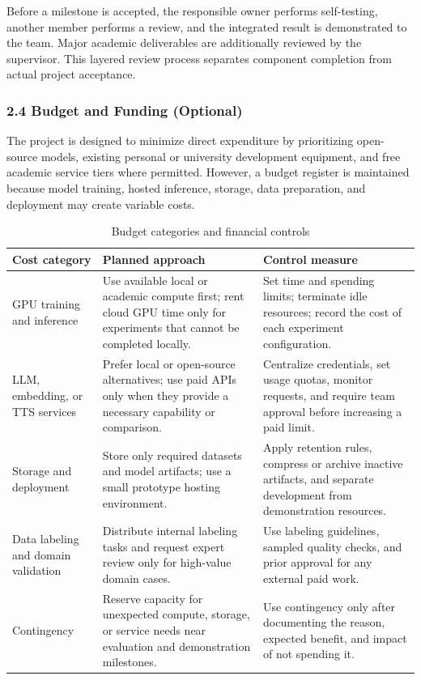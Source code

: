 \documentclass[11pt,a4paper]{article}
\begin{document}
Before a milestone is accepted, the responsible owner performs self-testing,
another member performs a review, and the integrated result is demonstrated to
the team. Major academic deliverables are additionally reviewed by the
supervisor. This layered review process separates component completion from
actual project acceptance.

\subsubsection{2.4 Budget and Funding (Optional)}

The project is designed to minimize direct expenditure by prioritizing
open-source models, existing personal or university development equipment, and
free academic service tiers where permitted. However, a budget register is
maintained because model training, hosted inference, storage, data preparation,
and deployment may create variable costs.

\begin{table}[htbp]
\centering
\caption{Budget categories and financial controls}
\label{tab:budget-plan}
\small
\renewcommand{\arraystretch}{1.25}
\begin{tabularx}{\textwidth}{|p{}|p{}|X|}
\hline
\rowcolor{tableheader}
\textbf{Cost category} & \textbf{Planned approach} & \textbf{Control measure} \\
\hline
GPU training and inference & Use available local or academic compute first;
rent cloud GPU time only for experiments that cannot be completed locally. &
Set time and spending limits; terminate idle resources; record the cost of each
experiment configuration. \\
\hline
LLM, embedding, or TTS services & Prefer local or open-source alternatives;
use paid APIs only when they provide a necessary capability or comparison. &
Centralize credentials, set usage quotas, monitor requests, and require team
approval before increasing a paid limit. \\
\hline
Storage and deployment & Store only required datasets and model artifacts;
use a small prototype hosting environment. &
Apply retention rules, compress or archive inactive artifacts, and separate
development from demonstration resources. \\
\hline
Data labeling and domain validation & Distribute internal labeling tasks and
request expert review only for high-value domain cases. &
Use labeling guidelines, sampled quality checks, and prior approval for any
external paid work. \\
\hline
Contingency & Reserve capacity for unexpected compute, storage, or service
needs near evaluation and demonstration milestones. &
Use contingency only after documenting the reason, expected benefit, and impact
of not spending it. \\
\hline
\end{tabularx}
\end{table}
\FloatBarrier
\end{document}
